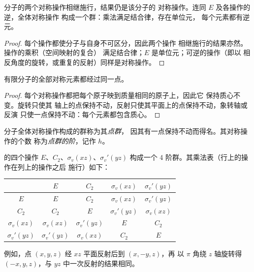 \begin{proposition}[对称操作的乘积]\label{prop:b3:point-groups:closure}
分子的两个对称操作相继施行，结果仍是该分子的
对称操作。连同 $E$ 及各操作的逆，全体对称操作
构成一个群：乘法满足结合律，存在单位元，
每个元素都有逆元。
\end{proposition}

\begin{proof}
每个操作都使分子与自身不可区分，因此两个操作
相继施行的结果亦然。操作的乘积（空间映射的复合）
满足结合律；$E$ 是单位元；可逆的操作（即以
相反角度的旋转，或重复的反射）同样是对称操作。
\end{proof}

\begin{proposition}[公共点]\label{prop:b3:point-groups:fixed-point}
有限分子的全部对称元素都经过同一点。
\end{proposition}

\begin{proof}
每个对称操作都把每个原子映到质量相同的原子上，因此它
保持质心不变。旋转只使其
轴上的点保持不动，反射只使其平面上的点保持不动，象转轴或反演
只使一点保持不动：每个元素都包含质心。
\end{proof}

\begin{definition}[点群，点群的阶]\label{def:b3:point-groups:point-group}
分子全体对称操作构成的群称为其\emph{点群}，
因其有一点保持不动而得名。其对称操作的个数
称为\emph{点群的阶}，记作
$h$。
\end{definition}

\begin{example}[水分子的群]\label{ex:b3:point-groups:c2v}
 的四个操作 $E$、$C_2$、$\sigma_v(xz)$、$\sigma_v'(yz)$ 构成一个
4 阶群。其乘法表（行上的操作在列上的操作之后
施行）如下：
\begin{center}\small
\begin{tabular}{c|cccc}
\hline
 & $E$ & $C_2$ & $\sigma_v(xz)$ & $\sigma_v'(yz)$\\ \hline
$E$ & $E$ & $C_2$ & $\sigma_v(xz)$ & $\sigma_v'(yz)$\\
$C_2$ & $C_2$ & $E$ & $\sigma_v'(yz)$ & $\sigma_v(xz)$\\
$\sigma_v(xz)$ & $\sigma_v(xz)$ & $\sigma_v'(yz)$ & $E$ & $C_2$\\
$\sigma_v'(yz)$ & $\sigma_v'(yz)$ & $\sigma_v(xz)$ & $C_2$ & $E$\\ \hline
\end{tabular}
\end{center}
例如，点 $(x, y, z)$ 经 $xz$ 平面反射后到 $(x, -y, z)$，再
以 $\pi$ 角绕 $z$ 轴旋转得 $(-x, y, z)$，与
$yz$ 中一次反射的结果相同。
\end{example}

